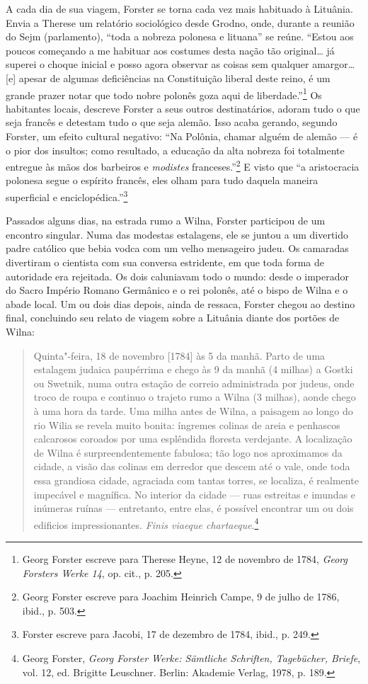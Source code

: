 A cada dia de sua viagem, Forster se torna cada vez mais habituado à
Lituânia. Envia a Therese um relatório sociológico desde Grodno, onde,
durante a reunião do Sejm (parlamento), ``toda a nobreza polonesa e
lituana'' se reúne. ``Estou aos poucos começando a me habituar aos
costumes desta nação tão original\ldots{} já superei o choque inicial e
posso agora observar as coisas sem qualquer amargor\ldots{} {[}e{]}
apesar de algumas deficiências na Constituição liberal deste reino, é um
grande prazer notar que todo nobre polonês goza aqui de
liberdade.''\footnote{Georg Forster escreve para Therese Heyne, 12 de
  novembro de 1784, \emph{Georg Forsters Werke 14}, op. cit., p. 205.}
Os habitantes locais, descreve Forster a seus outros destinatários,
adoram tudo o que seja francês e detestam tudo o que seja alemão. Isso
acaba gerando, segundo Forster, um efeito cultural negativo: ``Na
Polônia, chamar alguém de alemão --- é o pior dos insultos; como
resultado, a educação da alta nobreza foi totalmente entregue às mãos
dos barbeiros e \emph{modistes} franceses.''\footnote{Georg Forster
  escreve para Joachim Heinrich Campe, 9 de julho de 1786, ibid., p.
  503.} E visto que ``a aristocracia polonesa segue o espírito francês,
eles olham para tudo daquela maneira superficial e
enciclopédica.''\footnote{Forster escreve para Jacobi, 17 de dezembro de
  1784, ibid., p. 249.}

Passados alguns dias, na estrada rumo a Wilna, Forster participou de um
encontro singular. Numa das modestas estalagens, ele se juntou a um
divertido padre católico que bebia vodca com um velho mensageiro judeu.
Os camaradas divertiram o cientista com sua conversa estridente, em que
toda forma de autoridade era rejeitada. Os dois caluniavam todo o mundo:
desde o imperador do Sacro Império Romano Germânico e o rei polonês, até
o bispo de Wilna e o abade local. Um ou dois dias depois, ainda de
ressaca, Forster chegou ao destino final, concluindo seu relato de
viagem sobre a Lituânia diante dos portões de Wilna:

\begin{quote}
Quinta"-feira, 18 de novembro {[}1784{]} às 5 da manhã. Parto de uma
estalagem judaica paupérrima e chego às 9 da manhã (4 milhas) a Gostki
ou Swetnik, numa outra estação de correio administrada por judeus, onde
troco de roupa e continuo o trajeto rumo a Wilna (3 milhas), aonde chego
à uma hora da tarde. Uma milha antes de Wilna, a paisagem ao longo do
rio Wilia se revela muito bonita: íngremes colinas de areia e penhascos
calcarosos coroados por uma esplêndida floresta verdejante. A
localização de Wilna é surpreendentemente fabulosa; tão logo nos
aproximamos da cidade, a visão das colinas em derredor que descem até o
vale, onde toda essa grandiosa cidade, agraciada com tantas torres, se
localiza, é realmente impecável e magnífica. No interior da cidade ---
ruas estreitas e imundas e inúmeras ruínas --- entretanto, entre elas, é
possível encontrar um ou dois edificios impressionantes. \emph{Finis
viaeque chartaeque}.\footnote{Georg Forster, \emph{Georg Forster Werke:
  Sämtliche Schriften, Tagebücher, Briefe}, vol. 12, ed. Brigitte
  Leuschner. Berlin: Akademie Verlag, 1978, p. 189.}
\end{quote}

